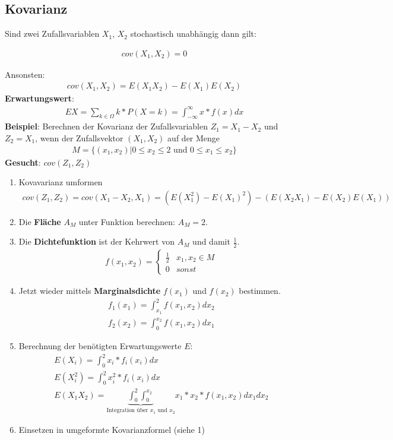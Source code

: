 \documentclass{article}
\begin{document}
\subsection{Kovarianz}
Sind zwei Zufallsvariablen $X_1$, $X_2$ stochastisch unabh\"angig dann
gilt:

\begin{align}
	cov(X_1,X_2) = 0
\end{align}

Ansonsten:
\begin{align}
	cov(X_1,X_2) = E(X_1X_2) - E(X_1)E(X_2)
\end{align}
\textbf{Erwartungswert}:
\begin{align}
	EX = \sum_{k \in \Omega} k * P(X = k) = \int_{-\infty}^{\infty} x * f(x) dx
\end{align}
\textbf{Beispiel}:
Berechnen der Kovarianz der Zufallsvariablen $Z_1 = X_1 - X_2$ und $Z_2 = X_1$,
wenn der Zufallsvektor $(X_1,X_2)$ auf der Menge
\begin{align}
	M = \{(x_1,x_2)| 0 \leq x_2 \leq 2 \text{ und } 0 \leq x_1 \leq x_2\}
\end{align}
\textbf{Gesucht}: $cov(Z_1, Z_2)$
\begin{enumerate}
	\item Kovavarianz umformen
		\begin{align}
			cov(Z_1, Z_2) = cov(X_1-X_2, X_1) = (E(X^2_1)-E(X_1)^2)-(E(X_2X_1)-E(X_2)E(X_1))
		\end{align}
	\item Die \textbf{Fl\"ache} $A_M$ unter Funktion berechnen: $A_M = 2$.\\
	\item Die \textbf{Dichtefunktion} ist der Kehrwert von $A_M$ und damit $\frac{1}{2}$.
		\begin{align}
			f(x_1,x_2) =
			\begin{cases}
				\frac{1}{2} & x_1,x_2 \in M \\
				0 & sonst
			\end{cases}
		\end{align}
	\item Jetzt wieder mittels \textbf{Marginalsdichte} $f(x_1)$ und $f(x_2)$ bestimmen.
		\begin{align}
			f_1(x_1) = \int_{x_1}^2 f(x_1,x_2) dx_2\\
			f_2(x_2) = \int_{0}^{x_2} f(x_1,x_2) dx_1
		\end{align}
	\item Berechnung der ben\"otigten Erwartungswerte $E$:
		\begin{align}
			E(X_i) = \int_{0}^{2} x_i * f_i(x_i) dx\\
			E(X_i^2) = \int_{0}^{2} x_i^2 * f_i(x_i) dx\\
			E(X_1X_2) = \underbrace{\int_0^{2}\int_{0}^{x_2}}_{\text{Integration \"uber $x_1$ und
			$x_2$}} x_1*x_2*f(x_1,x_2) dx_1 dx_2
		\end{align}
	\item Einsetzen in umgeformte Kovarianzformel (siehe 1)
\end{enumerate}
\end{document}

